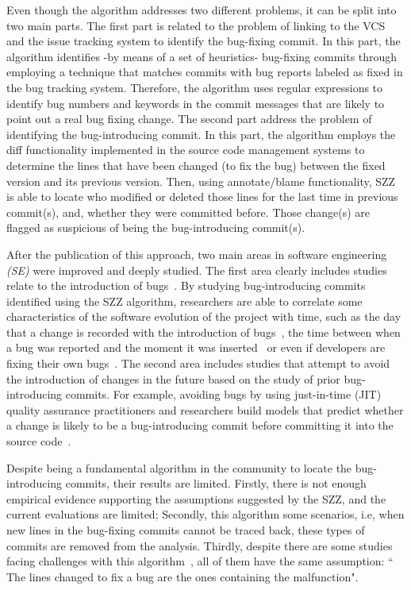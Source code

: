 \documentclass[a4paper, 12pt]{book}
\begin{document}
Even though the algorithm addresses two different problems, it can be split into two main parts. The first part is related to the problem of linking to the VCS and the issue tracking system to identify the bug-fixing commit. In this part, the algorithm identifies -by means of a set of heuristics- bug-fixing commits through employing a technique that matches commits with bug reports labeled as fixed in the bug tracking system. Therefore, the algorithm uses regular expressions to identify bug numbers and keywords in the commit messages that are likely to point out a real bug fixing change. %
The second part address the problem of identifying the bug-introducing commit. In this part, the algorithm employs the diff functionality implemented in the source code management systems to determine the lines that have been changed (to fix the bug) between the fixed version and its previous version. Then, using annotate/blame functionality, SZZ is able to locate who modified or deleted those lines for the last time in previous commit(s), and, whether they were committed before. Those change(s) are flagged as suspicious of being the bug-introducing commit(s).

After the publication of this approach, two main areas in software engineering \emph{(SE)} were improved and deeply studied. The first area clearly includes studies relate to the introduction of bugs~\cite{ pan2009toward,eyolfson2011time,asaduzzaman2012bug,bernardi2012developers,yangbug}. By studying bug-introducing commits identified using the SZZ algorithm, researchers are able to correlate some characteristics of the software evolution of the project with time, such as the day that a change is recorded with the introduction of bugs~\cite{sliwerski2005changes}, the time between when a bug was reported and the moment it was inserted~\cite{rodriguez2017much} or even if developers are fixing their own bugs~\cite{izquierdo2011developers}. The second area includes studies that attempt to avoid the introduction of changes in the future based on the study of prior bug-introducing commits. For example, avoiding bugs by using just-in-time (JIT) quality assurance practitioners and researchers build models that predict whether a change is likely to be a bug-introducing commit before committing it into the source code~\cite{kim2008classifying,kamei2013large,kamei2010revisiting,nagappan2006mining}.

Despite being a fundamental algorithm in the community to locate the bug-introducing commits, their results are limited. Firstly, there is not enough empirical evidence supporting the assumptions suggested by the SZZ, and the current evaluations are limited; Secondly, this algorithm  some scenarios, i.e, when new lines in the bug-fixing commits cannot be traced back, these types of commits are removed from the analysis. Thirdly, despite there are some studies facing challenges with this algorithm~\cite{kim2006automatic,williams2008szz,da2016framework}, all of them have the same assumption: `` The lines changed to fix a bug are the ones containing the malfunction".
\end{document}
